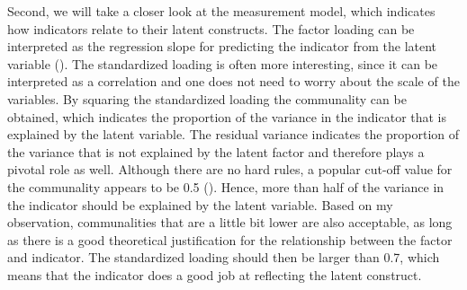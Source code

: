 \documentclass[11pt]{article}
\begin{document}
Second, we will take a closer look at the measurement model, which indicates
how indicators relate to their latent constructs. The factor loading can be
interpreted as the regression slope for predicting the indicator from the latent
variable (\cite{brown2015}). The standardized loading is often more interesting,
since it can be interpreted as a correlation and one does not need to worry
about the scale of the variables. By squaring the standardized loading the
communality can be obtained, which indicates the proportion of the variance in
the indicator that is explained by the latent variable. The residual variance
indicates the proportion of the variance that is not explained by the latent
factor and therefore plays a pivotal role as well. Although there are no hard
rules, a popular cut-off value for the communality appears to be 0.5
(\cite{hair2010}). Hence, more than half of the variance in the indicator should
be explained by the latent variable. Based on my observation, communalities that
are a little bit lower are also acceptable, as long as there is a good
theoretical justification for the relationship between the factor and indicator.
The standardized loading should then be larger than 0.7, which means that the
indicator does a good job at reflecting the latent construct.

\end{document}
